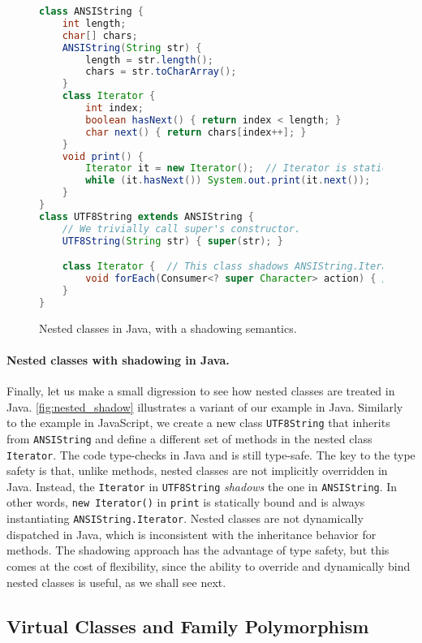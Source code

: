 \begin{figure}
\begin{lstlisting}[language=Java]
class ANSIString {
    int length;
    char[] chars;
    ANSIString(String str) {
        length = str.length();
        chars = str.toCharArray();
    }
    class Iterator {
        int index;
        boolean hasNext() { return index < length; }
        char next() { return chars[index++]; }
    }
    void print() {
        Iterator it = new Iterator();  // Iterator is statically bound.
        while (it.hasNext()) System.out.print(it.next());
    }
}
class UTF8String extends ANSIString {
    // We trivially call super's constructor.
    UTF8String(String str) { super(str); }

    class Iterator {  // This class shadows ANSIString.Iterator.
        void forEach(Consumer<? super Character> action) { /* ... */ }
    }
}
\end{lstlisting}
\caption{Nested classes in Java, with a shadowing semantics.}
\label{fig:nested_shadow}
\end{figure}

\paragraph{Nested classes with shadowing in Java.}
Finally, let us make a small digression to see how nested classes are treated in
Java. \autoref{fig:nested_shadow} illustrates a variant of our example in Java.
Similarly to the example in JavaScript, we create a new class
\lstinline{UTF8String} that inherits from \lstinline{ANSIString} and define a
different set of methods in the nested class \lstinline{Iterator}. The code
type-checks in Java and is still type-safe. The key to the type safety is that,
unlike methods, nested classes are not implicitly overridden in Java. Instead,
the \lstinline{Iterator} in \lstinline{UTF8String} \emph{shadows} the one in
\lstinline{ANSIString}. In other words, \lstinline{new Iterator()} in
\lstinline{print} is statically bound and is always instantiating
\lstinline{ANSIString.Iterator}. Nested classes are not dynamically dispatched
in Java, which is inconsistent with the inheritance behavior for methods. The
shadowing approach has the advantage of type safety, but this comes at the cost
of flexibility, since the ability to override and dynamically bind nested
classes is useful, as we shall see next.

\subsection{Virtual Classes and Family Polymorphism} \label{sec:family}

